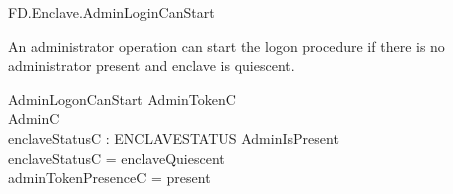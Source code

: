 \begin{traceunit}{FD.Enclave.AdminLoginCanStart}
\end{traceunit}

An administrator operation can start the logon procedure if there is
no administrator present and enclave is quiescent. 

\begin{schema}{AdminLogonCanStart}
        AdminTokenC
\\      AdminC
\\      enclaveStatusC : ENCLAVESTATUS
\where
        \lnot AdminIsPresent
\\      enclaveStatusC = enclaveQuiescent
\\      adminTokenPresenceC = present
\end{schema}




